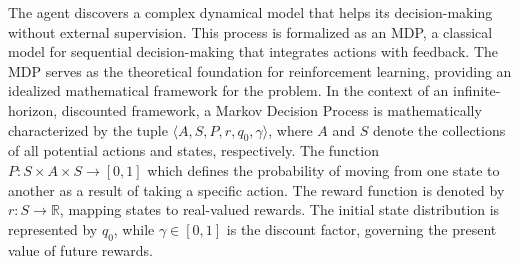 \documentclass[conference]{IEEEtran}
\begin{document}
The agent discovers a complex dynamical model that helps its decision-making without external supervision. This process is formalized as an MDP, a classical model for sequential decision-making that integrates actions with feedback. The MDP serves as the theoretical foundation for reinforcement learning, providing an idealized mathematical framework for the problem.
In the context of an infinite-horizon, discounted framework, a Markov Decision Process is mathematically characterized by the tuple \( \langle A, S, P, r, q_0, \gamma \rangle \), where \( A \) and \( S \) denote the collections of all potential actions and states, respectively. The function \( P: S \times A \times S \to [0, 1] \)
which defines the probability of moving from one state to another as a result of taking a specific action. The reward function is denoted by \( r: S \to \mathbb{R} \), mapping states to real-valued rewards.
The initial state distribution is represented by \( q_0 \), while \( \gamma \in [0, 1] \) is the discount factor, governing the present value of future rewards.



\end{document}
